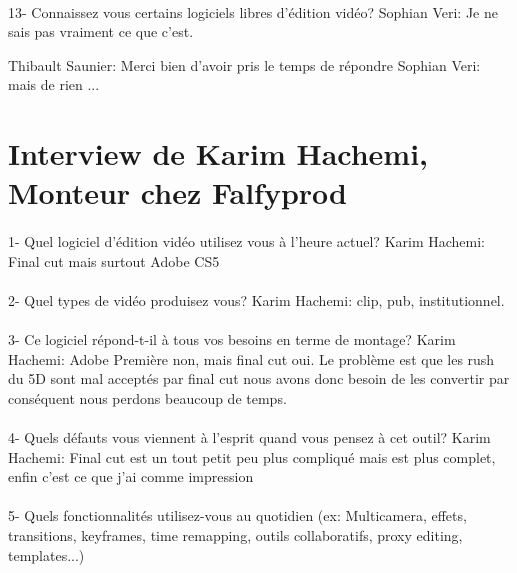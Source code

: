 \paragraph{}
13- Connaissez vous certains logiciels libres d'édition vidéo?
Sophian Veri: Je ne sais pas vraiment ce que c'est.

Thibault Saunier: Merci bien d'avoir pris le temps de répondre
    Sophian Veri: mais de rien
    ...

\section*{Interview de Karim Hachemi, Monteur chez Falfyprod}

\paragraph{}
1-  Quel logiciel d'édition vidéo utilisez vous à l'heure actuel?
Karim Hachemi: Final cut mais surtout Adobe CS5

\paragraph{}
2- Quel types de vidéo produisez vous?
Karim Hachemi: clip, pub, institutionnel.

\paragraph{}
3- Ce logiciel répond-t-il à tous vos besoins en terme de montage?
Karim Hachemi: Adobe Première non, mais final cut oui. Le problème est que les
rush du 5D sont mal acceptés par final cut nous avons donc besoin de les
convertir par conséquent nous perdons beaucoup de temps.
\paragraph{}
4- Quels défauts vous viennent à l'esprit quand vous pensez à cet outil?
Karim Hachemi: Final cut est un tout petit peu plus compliqué mais
est plus complet, enfin c'est ce que j'ai comme impression


\paragraph{}
5-  Quels fonctionnalités utilisez-vous au quotidien (ex: Multicamera, effets,
transitions, keyframes, time remapping, outils collaboratifs, proxy
editing, templates...)

